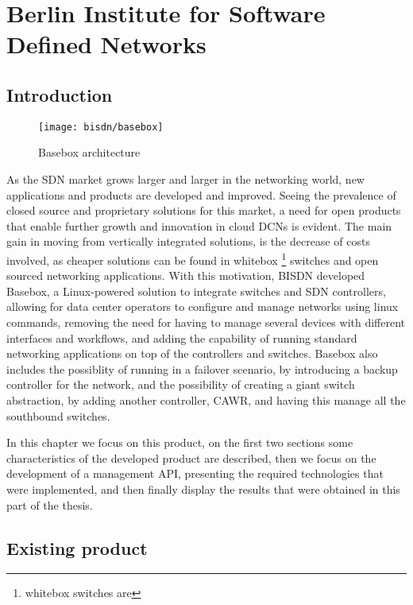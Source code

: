 \chapter {Berlin Institute for Software Defined Networks} \label{chap:bisdn} %

\section {Introduction}

\begin{figure} [!htbp]
    \centering
    \texttt{[image: bisdn/basebox]}
    \caption{Basebox architecture}
\end{figure}

As the SDN market grows larger and larger in the networking world, new applications and products are developed and improved. Seeing the prevalence of closed source and proprietary solutions for this market, a need for open
products that enable further growth and innovation in cloud DCNs is evident. The main gain in moving from vertically integrated solutions, is the decrease of costs involved, as cheaper solutions can be found in whitebox 
\footnote {whitebox switches are} switches and open sourced networking applications. With this motivation, BISDN developed Basebox, a Linux-powered solution to integrate switches and SDN controllers, allowing for data center 
operators to configure and manage networks using linux commands, removing the need for having to manage several devices with different interfaces and workflows, and adding the capability of running standard networking applications 
on top of the controllers and switches. Basebox also includes the possiblity of running in a failover scenario, by introducing a backup controller for the network, and the possibility of creating a giant switch abstraction, 
by adding another controller, CAWR, and having this manage all the southbound switches.

\par In this chapter we focus on this product, on the first two sections some characteristics of the developed product are described, then we focus on the development of a management API, presenting the required technologies that 
were implemented, and then finally display the results that were obtained in this part of the thesis.

\section {Existing product}


